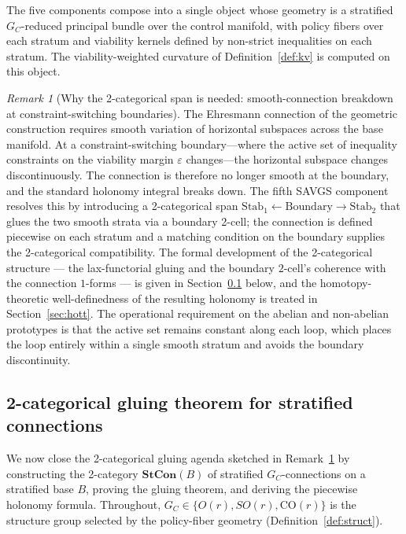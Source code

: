 \documentclass[11pt,a4paper]{article}
\theoremstyle{plain}
\theoremstyle{definition}
\theoremstyle{remark}
\newtheorem{remark}[theorem]{Remark}
\newcommand{\CO}{\mathrm{CO}}
\newcommand{\Stab}{\mathrm{Stab}}
\begin{document}
The five components compose into a single object whose geometry is a
stratified $G_C$-reduced principal bundle over the control manifold, with
policy fibers over each stratum and viability kernels defined by
non-strict inequalities on each stratum. The viability-weighted
curvature of Definition~\ref{def:kv} is computed on this
object.

\begin{remark}[Why the 2-categorical span is needed: smooth-connection
breakdown at constraint-switching boundaries]
\label{rem:2cat-span}
The Ehresmann connection of the geometric construction requires
smooth variation of horizontal subspaces across the base manifold.
At a constraint-switching boundary---where the active set of
inequality constraints on the viability margin $\varepsilon$
changes---the horizontal subspace changes discontinuously. The
connection is therefore no longer smooth at the boundary, and the
standard holonomy integral breaks down. The fifth SAVGS component
resolves this by introducing a 2-categorical span
$\Stab_1\leftarrow\mathrm{Boundary}\rightarrow\Stab_2$ that glues the
two smooth strata via a boundary 2-cell; the connection is defined
piecewise on each stratum and a matching condition on the boundary
supplies the 2-categorical compatibility. The formal development of
the 2-categorical structure --- the lax-functorial gluing and the
boundary $2$-cell's coherence with the connection $1$-forms --- is
given in Section~\ref{sec:2cat-gluing} below, and the
homotopy-theoretic well-definedness of the resulting holonomy is
treated in Section~\ref{sec:hott}. The operational requirement on the abelian and non-abelian
prototypes is that the active set
remains constant along each loop, which places the loop entirely
within a single smooth stratum and avoids the boundary discontinuity.
\end{remark}

\subsection{2-categorical gluing theorem for stratified connections}
\label{sec:2cat-gluing}

We now close the 2-categorical gluing agenda sketched in
Remark~\ref{rem:2cat-span} by constructing the 2-category
$\mathbf{StCon}(B)$ of stratified $G_C$-connections on a stratified base
$B$, proving the gluing theorem, and deriving the piecewise holonomy
formula. Throughout, $G_C \in \{O(r), SO(r), \CO(r)\}$ is the structure
group selected by the policy-fiber geometry (Definition~\ref{def:struct}).
\end{document}
